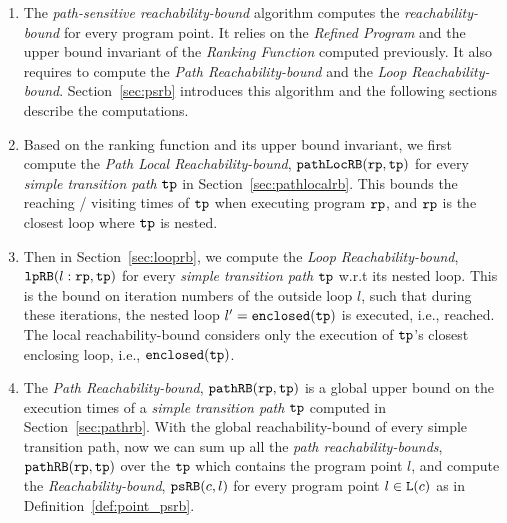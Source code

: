 \begin{enumerate}
\item The \emph{path-sensitive reachability-bound} algorithm computes the \emph{reachability-bound} for every program point.
It relies on the \emph{Refined Program} and the upper bound invariant of the \emph{Ranking Function} computed previously.
It also requires to compute the \emph{Path Reachability-bound} and the \emph{Loop Reachability-bound}.
Section~\ref{sec:psrb} introduces this algorithm and the following sections describe the computations. 
    \item Based on the ranking function and its upper bound invariant, we first compute the \emph{Path Local Reachability-bound}, $\mathtt{pathLocRB}(\mathtt{rp}, \mathtt{tp})$ for every \emph{simple transition path} $\mathtt{tp}$ in Section~\ref{sec:pathlocalrb}. 
    This bounds the reaching / visiting times of $\mathtt{tp}$ when executing program $\mathtt{rp}$, and $\mathtt{rp}$ is the closest loop where $\mathtt{tp}$ is nested.
    \item Then in Section~\ref{sec:looprb}, we compute the \emph{Loop Reachability-bound}, $\mathtt{lpRB}(l: \mathtt{rp}, \mathtt{tp})$ for every \emph{simple transition path} $\mathtt{tp}$
    w.r.t its nested loop. 
    This is the bound on iteration numbers of the outside loop $l$,
    such that during these iterations, the nested loop $l' = \mathtt{enclosed(\mathtt{tp})}$ is executed, i.e., reached.
    The local reachability-bound  considers only the execution of $\mathtt{tp}$'s closest enclosing loop, i.e., $\mathtt{enclosed}(\mathtt{tp})$.
    \item The \emph{Path Reachability-bound}, $\mathtt{pathRB}(\mathtt{rp}, \mathtt{tp})$  is a global upper bound on the execution times of a \emph{simple transition path} $\mathtt{tp}$ computed in Section~\ref{sec:pathrb}.
    With the global reachability-bound of every simple transition path, now we can sum up all the \emph{path reachability-bounds}, $\mathtt{pathRB}(\mathtt{rp}, \mathtt{tp})$ over the $\mathtt{tp}$ which contains the program point $l$, and compute the \emph{Reachability-bound}, $\mathtt{psRB}(c, l)$ for every program point $l \in \mathtt{L}(c)$ as in Definition~\ref{def:point_psrb}.
\end{enumerate}